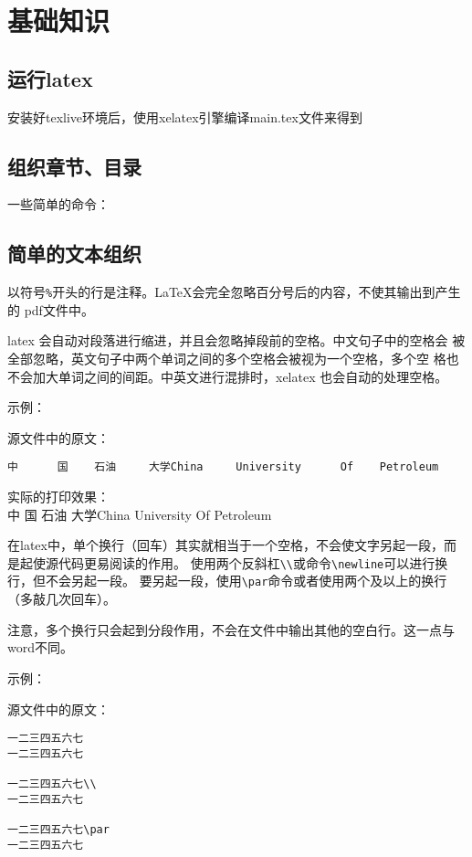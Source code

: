 \documentclass[../../main.tex]{subfiles}
\begin{document}
\section{基础知识}
\subsection{运行latex}
安装好texlive环境后，使用xelatex引擎编译main.tex文件来得到
\subsection{组织章节、目录}
一些简单的命令：



\subsection{简单的文本组织}

以符号\verb|%|开头的行是注释。LaTeX会完全忽略百分号后的内容，不使其输出到产生的
pdf文件中。


latex 会自动对段落进行缩进，并且会忽略掉段前的空格。中文句子中的空格会
被全部忽略，英文句子中两个单词之间的多个空格会被视为一个空格，多个空
格也不会加大单词之间的间距。中英文进行混排时，xelatex 也会自动的处理空格。

示例：

源文件中的原文：

\verb|中      国    石油     大学China     University      Of    Petroleum|

实际的打印效果：\\
中      国    石油     大学China               University      Of    Petroleum



在latex中，单个换行（回车）其实就相当于一个空格，不会使文字另起一段，而是起使源代码更易阅读的作用。
使用两个反斜杠\verb|\\|或命令\verb|\newline|可以进行换行，但不会另起一段。
要另起一段，使用\verb|\par|命令或者使用两个及以上的换行（多敲几次回车）。

注意，多个换行只会起到分段作用，不会在文件中输出其他的空白行。这一点与word不同。

示例：

源文件中的原文：
\begin{verbatim}
一二三四五六七
一二三四五六七

一二三四五六七\\
一二三四五六七

一二三四五六七\par
一二三四五六七
\end{verbatim}
\end{document}
